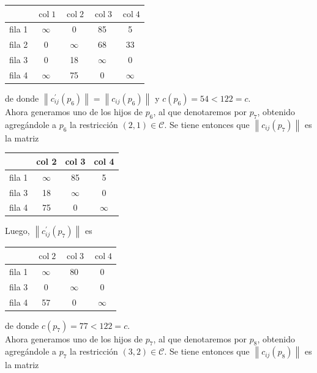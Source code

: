 \documentclass[10pt]{article}
\begin{document}
\begin{center}
\begin{tabular}{|l|c|c|c|c|}
\hline
 & $\operatorname{col} 1$ & $\operatorname{col} 2$ & $\operatorname{col} 3$ & $\operatorname{col} 4$ \\
\hline
fila 1 & $\infty$ & 0 & 85 & 5 \\
\hline
fila 2 & 0 & $\infty$ & 68 & 33 \\
\hline
fila 3 & 0 & 18 & $\infty$ & 0 \\
\hline
fila 4 & $\infty$ & 75 & 0 & $\infty$ \\
\hline
\end{tabular}
\end{center}

de donde $\left\|c_{i j}^{\prime}\left(p_{6}\right)\right\|=\left\|c_{i j}\left(p_{6}\right)\right\|$ y $c\left(p_{6}\right)=54<122=c$.\\
Ahora generamos uno de los hijos de $p_{6}$, al que denotaremos por $p_{7}$, obtenido agregándole a $p_{6}$ la restricción $(2,1) \in \mathcal{C}$. Se tiene entonces que $\left\|c_{i j}\left(p_{7}\right)\right\|$ es la matriz

\begin{center}
\begin{tabular}{|l|c|c|c|}
\hline
 & col 2 & col 3 & col 4 \\
\hline
fila 1 & $\infty$ & 85 & 5 \\
\hline
fila 3 & 18 & $\infty$ & 0 \\
\hline
fila 4 & 75 & 0 & $\infty$ \\
\hline
\end{tabular}
\end{center}

Luego, $\left\|c_{i j}^{\prime}\left(p_{7}\right)\right\|$ es

\begin{center}
\begin{tabular}{|c|c|c|c|}
\hline
 & $\operatorname{col} 2$ & $\operatorname{col} 3$ & $\operatorname{col} 4$ \\
\hline
fila 1 & $\infty$ & 80 & 0 \\
\hline
fila 3 & 0 & $\infty$ & 0 \\
\hline
fila 4 & 57 & 0 & $\infty$ \\
\hline
\end{tabular}
\end{center}

de donde $c\left(p_{7}\right)=77<122=c$.\\
Ahora generamos uno de los hijos de $p_{7}$, al que denotaremos por $p_{8}$, obtenido agregándole a $p_{7}$ la restricción $(3,2) \in \mathcal{C}$. Se tiene entonces que $\left\|c_{i j}\left(p_{8}\right)\right\|$ es la matriz
\end{document}

